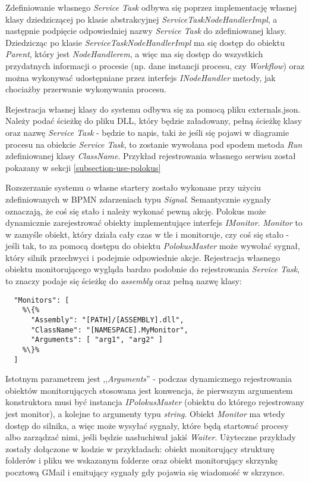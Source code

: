\documentclass[declaration,shortabstract,mgr]{iithesis}
\newcommand{\bpmn}{BPMN }
\begin{document}
Zdefiniowanie własnego \textit{Service Task} odbywa się poprzez implementację własnej klasy dziedziczącej po klasie abstrakcyjnej \textit{ServiceTaskNodeHandlerImpl}, a następnie podpięcie odpowiedniej nazwy \textit{Service Task} do zdefiniowanej klasy. Dziedzicząc po klasie \textit{ServiceTaskNodeHandlerImpl} ma się dostęp do obiektu \textit{Parent}, który jest \textit{NodeHandlerem}, a więc ma się dostęp do wszystkich przydatnych informacji o procesie (np. dane instancji procesu, czy \textit{Workflow}) oraz można wykonywać udostępniane przez interfejs \textit{INodeHandler} metody, jak chociażby przerwanie wykonywania procesu.

Rejestracja własnej klasy do systemu odbywa się za pomocą pliku externals.json. Należy podać ścieżkę do pliku DLL, który będzie załadowany, pełną ścieżkę klasy oraz nazwę \textit{Service Task} - będzie to napis, taki że jeśli się pojawi w diagramie procesu na obiekcie \textit{Service Task}, to zostanie wywołana pod spodem metoda \textit{Run} zdefiniowanej klasy \textit{ClassName}. Przykład rejestrowania własnego serwisu został pokazany w sekcji \ref{subsection-use-polokus}

Rozszerzanie systemu o własne startery zostało wykonane przy użyciu zdefiniowanych w \bpmn zdarzeniach typu \textit{Signal}. Semantycznie sygnały oznaczają, że coś się stało i należy wykonać pewną akcję. Polokus może dynamicznie zarejestrować obiekty implementujące interfejs \textit{IMonitor}. \textit{Monitor} to w zamyśle obiekt, który działa cały czas w tle i monitoruje, czy coś się stało - jeśli tak, to za pomocą dostępu do obiektu \textit{PolokusMaster} może wywołać sygnał, który silnik przechwyci i podejmie odpowiednie akcje. Rejestracja własnego obiektu monitorującego wygląda bardzo podobnie do rejestrowania \textit{Service Task}, to znaczy podaje się ścieżkę do \textit{assembly} oraz pełną nazwę klasy:

\begin{minipage}[c]{\textwidth}
\centering
\begin{lstlisting}
  "Monitors": [
    %\{%
      "Assembly": "[PATH]/[ASSEMBLY].dll",
      "ClassName": "[NAMESPACE].MyMonitor",
      "Arguments": [ "arg1", "arg2" ]
    %\}%
  ]
\end{lstlisting}
\end{minipage}

 Istotnym parametrem jest ,,\textit{Arguments}'' - podczas dynamicznego rejestrowania obiektów monitorujących stosowana jest konwencja, że pierwszym argumentem konstruktora musi być instancja \textit{IPolokusMaster} (obiektu do którego rejestrowany jest monitor), a kolejne to argumenty typu \textit{string}. Obiekt \textit{Monitor} ma wtedy dostęp do silnika, a więc może wysyłać sygnały, które będą startować procesy albo zarządzać nimi, jeśli będzie nasłuchiwał jakiś \textit{Waiter}. Użyteczne przykłady zostały dołączone w kodzie w przykładach: obiekt monitorujący strukturę folderów i pliku we wskazanym folderze oraz obiekt monitorujący skrzynkę pocztową GMail i emitujący sygnały gdy pojawia się wiadomość w skrzynce.
\end{document}
